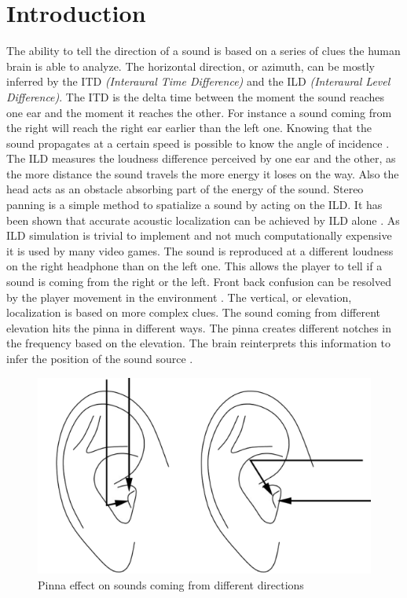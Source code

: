 \documentclass[conference]{IEEEtran}
\begin{document}
\section{Introduction}
The ability to tell the direction of a sound is based on a series of clues the human brain is able to analyze.
The horizontal direction, or azimuth, can be mostly inferred by the ITD \textit{(Interaural Time Difference)} and the ILD \textit{(Interaural Level Difference)}.
The ITD is the delta time between the moment the sound reaches one ear and the moment it reaches the other. For instance a sound coming from the right will reach the right ear earlier than the left one. Knowing that the sound propagates at a certain speed is possible to know the angle of incidence \cite{b1}.
The ILD measures the loudness difference perceived by one ear and the other, as the more distance the sound travels the more energy it loses on the way. Also the head acts as an obstacle absorbing part of the energy of the sound.
Stereo panning is a simple method to spatialize a sound by acting on the ILD. It has been shown that accurate acoustic localization can be achieved by ILD alone \cite{b2}.
As ILD simulation is trivial to implement and not much computationally expensive it is used by many video games.
The sound is reproduced at a different loudness on the right headphone than on the left one. This allows the player to tell if a sound is coming from the right or the left.
Front back confusion can be resolved by the player movement in the environment \cite{b3}.
The vertical, or elevation, localization is based on more complex clues. The sound coming from different elevation hits the pinna in different ways. The pinna creates different notches in the frequency based on the elevation. The brain reinterprets this information to infer the position of the sound source \cite{b4}.
\begin{figure}[htbp]
\centerline{\includegraphics{pinna.png}}
\caption{Pinna effect on sounds coming from different directions}
\label{fig1}
\end{figure}
\end{document}
